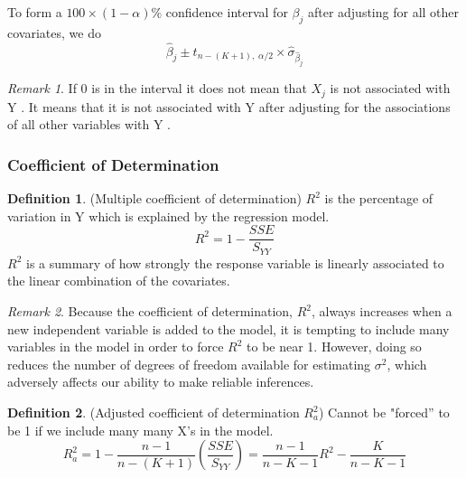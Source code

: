 \documentclass[12pt]{article}
\theoremstyle{definition}
\newtheorem{definition}{Definition}[section]
\theoremstyle{remark}
\newtheorem*{remark}{Remark}
\begin{document}
    To form a $100\times (1-\alpha)\%$ confidence interval for $\beta_j$ after adjusting for all other covariates, we do 
    $$\hat{\beta}_j \pm t_{n-(K+1), \;\alpha/2} \times \hat{\sigma}_{\hat{\beta}_j}$$
    \begin{remark}
        If 0 is in the interval it does not mean that $X_j$ is not associated with Y . It means that it is not associated with Y after adjusting for the associations of all other variables with Y .
    \end{remark}

\subsubsection{Coefficient of Determination}
    \begin{definition}(Multiple coefficient of determination) $R^2$ is the percentage of variation in
        Y which is explained by the regression model.
        $$R^2 = 1- \frac{SSE}{S_{YY}}$$
        $R^2$ is a summary of how strongly the response variable is linearly associated to the linear combination of the covariates.
    \end{definition}
    \begin{remark}
        Because the coefficient of determination, $R^2$, always increases when a new independent variable is added to the model,
        it is tempting to include many variables in the model in order to force $R^2$ to be near 1. However, doing so reduces 
        the number of degrees of freedom available for estimating $\sigma^2$, which adversely affects our ability to make reliable 
        inferences.
    \end{remark}
    \begin{definition}(Adjusted coefficient of determination $R^2_a$)
        Cannot be "forced” to be 1 if we include many many X's in the model.
        $$R^2_a = 1- \frac{n-1}{n-(K+1)} \left( \frac{SSE}{S_{YY}} \right)= \frac{n-1}{n-K-1} R^2 - \frac{K}{n-K-1}$$
    \end{definition}
\end{document}
